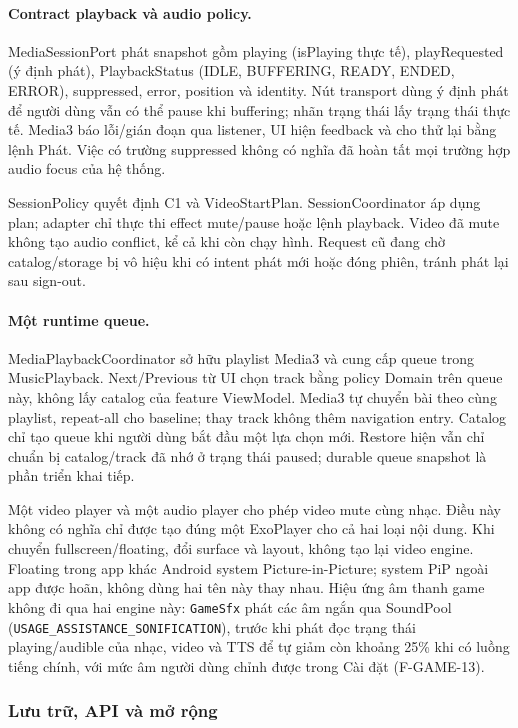 \paragraph{Contract playback và audio policy.}
MediaSessionPort phát snapshot gồm playing (isPlaying thực tế), playRequested (ý định phát), PlaybackStatus (IDLE, BUFFERING, READY, ENDED, ERROR), suppressed, error, position và identity. Nút transport dùng ý định phát để người dùng vẫn có thể pause khi buffering; nhãn trạng thái lấy trạng thái thực tế. Media3 báo lỗi/gián đoạn qua listener, UI hiện feedback và cho thử lại bằng lệnh Phát. Việc có trường suppressed không có nghĩa đã hoàn tất mọi trường hợp audio focus của hệ thống.

SessionPolicy quyết định C1 và VideoStartPlan. SessionCoordinator áp dụng plan; adapter chỉ thực thi effect mute/pause hoặc lệnh playback. Video đã mute không tạo audio conflict, kể cả khi còn chạy hình. Request cũ đang chờ catalog/storage bị vô hiệu khi có intent phát mới hoặc đóng phiên, tránh phát lại sau sign-out.

\paragraph{Một runtime queue.}
MediaPlayback\-Coordinator sở hữu playlist Media3 và cung cấp queue trong MusicPlayback. Next/Previous từ UI chọn track bằng policy Domain trên queue này, không lấy catalog của feature ViewModel. Media3 tự chuyển bài theo cùng playlist, repeat-all cho baseline; thay track không thêm navigation entry. Catalog chỉ tạo queue khi người dùng bắt đầu một lựa chọn mới. Restore hiện vẫn chỉ chuẩn bị catalog/track đã nhớ ở trạng thái paused; durable queue snapshot là phần triển khai tiếp.

Một video player và một audio player cho phép video mute cùng nhạc. Điều này không có nghĩa chỉ được tạo đúng một ExoPlayer cho cả hai loại nội dung. Khi chuyển fullscreen/floating, đổi surface và layout, không tạo lại video engine. Floating trong app khác Android system Picture-in-Picture; system PiP ngoài app được hoãn, không dùng hai tên này thay nhau. Hiệu ứng âm thanh game không đi qua hai engine này: \texttt{GameSfx} phát các âm ngắn qua SoundPool (\texttt{USAGE\_ASSISTANCE\_SONIFICATION}), trước khi phát đọc trạng thái playing/audible của nhạc, video và TTS để tự giảm còn khoảng 25\% khi có luồng tiếng chính, với mức âm người dùng chỉnh được trong Cài đặt (F-GAME-13).

\subsubsection{Lưu trữ, API và mở rộng}
\label{sec:data-sync}

